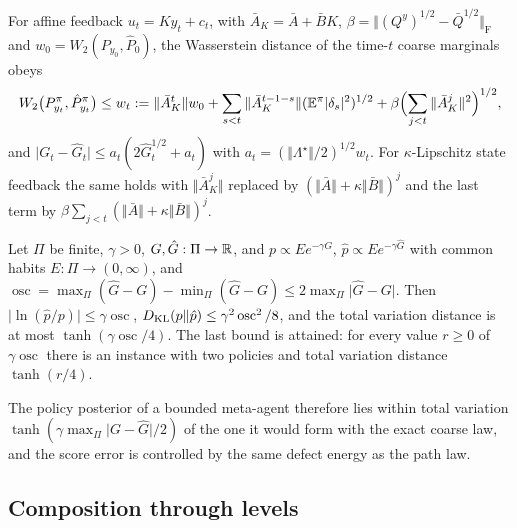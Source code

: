 \begin{proposition}\label{prop:apx-score}
For affine feedback $u_t=Ky_t+c_t$, with $\bar A_K=\bar A+\bar BK$, $\beta=\Vert(Q^y)^{1/2}-\bar Q^{1/2}\Vert_{\mathrm F}$ and $w_0=W_2(P_{y_0},\hat P_0)$, the Wasserstein distance of the time-$t$ coarse marginals obeys
\begin{equation}\label{eq:apx-w2}
W_2\bigl(P^\pi_{y_t},\hat P^\pi_{y_t}\bigr)\le w_t:=\Vert\bar A_K^t\Vert w_0+\sum_{s<t}\Vert\bar A_K^{t-1-s}\Vert(\mathbb{E}^\pi\lvert\delta_s\rvert^2)^{1/2}+\beta\Bigl(\sum_{j<t}\Vert\bar A_K^j\Vert^2\Bigr)^{1/2},
\end{equation}
and $\lvert G_t-\hat G_t\rvert\le a_t(2\hat G_t^{1/2}+a_t)$ with $a_t=(\Vert\Lambda^\star\Vert/2)^{1/2}w_t$. For $\kappa$-Lipschitz state feedback the same holds with $\Vert\bar A_K^j\Vert$ replaced by $(\Vert\bar A\Vert+\kappa\Vert\bar B\Vert)^j$ and the last term by $\beta\sum_{j<t}(\Vert\bar A\Vert+\kappa\Vert\bar B\Vert)^j$.
\end{proposition}

\begin{proposition}\label{prop:apx-softmax}
Let $\Pi$ be finite, $\gamma>0$, $G,\hat G:\Pi\to\mathbb{R}$, and $p\propto E e^{-\gamma G}$, $\hat p\propto E e^{-\gamma\hat G}$ with common habits $E:\Pi\to(0,\infty)$, and $\operatorname{osc}=\max_\Pi(\hat G-G)-\min_\Pi(\hat G-G)\le2\max_\Pi\lvert\hat G-G\rvert$. Then $\lvert\ln(\hat p/p)\rvert\le\gamma\operatorname{osc}$, $D_{\mathrm{KL}}(p\Vert\hat p)\le\gamma^2\operatorname{osc}^2/8$, and the total variation distance is at most $\tanh(\gamma\operatorname{osc}/4)$. The last bound is attained: for every value $r\ge0$ of $\gamma\operatorname{osc}$ there is an instance with two policies and total variation distance $\tanh(r/4)$.
\end{proposition}

The policy posterior of a bounded meta-agent therefore lies within total variation $\tanh(\gamma\max_\Pi\lvert G-\hat G\rvert/2)$ of the one it would form with the exact coarse law, and the score error is controlled by the same defect energy as the path law.

\subsection{Composition through levels}

